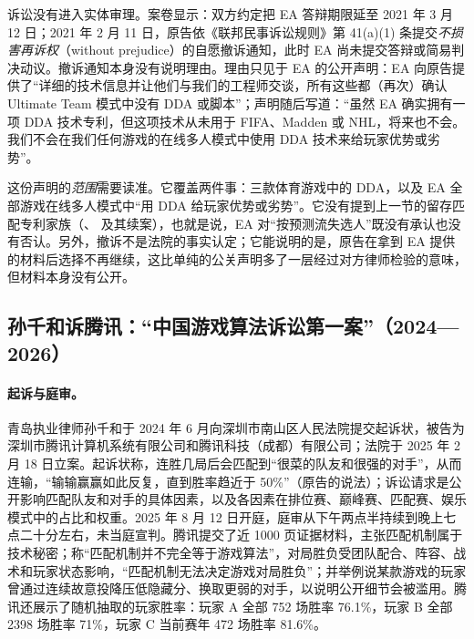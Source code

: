 诉讼没有进入实体审理。案卷显示：双方约定把 EA 答辩期限延至 2021 年 3 月 12 日；2021 年 2 月 11 日，原告依《联邦民事诉讼规则》第 41(a)(1) 条提交\emph{不损害再诉权}（without prejudice）的自愿撤诉通知，此时 EA 尚未提交答辩或简易判决动议\cite{courtlistener2021zajonc}\tagOff。撤诉通知本身没有说明理由。理由只见于 EA 的公开声明：EA 向原告提供了“详细的技术信息并让他们与我们的工程师交谈，所有这些都（再次）确认 Ultimate Team 模式中没有 DDA 或脚本”；声明随后写道：“虽然 EA 确实拥有一项 DDA 技术专利，但这项技术从未用于 FIFA、Madden 或 NHL，将来也不会。我们不会在我们任何游戏的在线多人模式中使用 DDA 技术来给玩家优势或劣势”\cite{ea2021dda}\tagOff。

这份声明的\emph{范围}需要读准。它覆盖两件事：三款体育游戏中的 DDA，以及 EA 全部游戏在线多人模式中“用 DDA 给玩家优势或劣势”。它没有提到上一节的留存匹配专利家族（、 及其续案），也就是说，EA 对“按预测流失选人”既没有承认也没有否认。另外，撤诉不是法院的事实认定；它能说明的是，原告在拿到 EA 提供的材料后选择不再继续，这比单纯的公关声明多了一层经过对方律师检验的意味，但材料本身没有公开。

\subsection{孙千和诉腾讯：“中国游戏算法诉讼第一案”（2024—2026）}

\paragraph{起诉与庭审。}
青岛执业律师孙千和于 2024 年 6 月向深圳市南山区人民法院提交起诉状，被告为深圳市腾讯计算机系统有限公司和腾讯科技（成都）有限公司；法院于 2025 年 2 月 18 日立案\cite{zhang2026hokfeb}\tagOff。起诉状称，连胜几局后会匹配到“很菜的队友和很强的对手”，从而连输，“输输赢赢如此反复，直到胜率趋近于 50\%”\tagCom（原告的说法）；诉讼请求是公开影响匹配队友和对手的具体因素，以及各因素在排位赛、巅峰赛、匹配赛、娱乐模式中的占比和权重\cite{fan2025hok}\tagOff。2025 年 8 月 12 日开庭，庭审从下午两点半持续到晚上七点二十分左右，未当庭宣判\cite{fan2025hok}\tagOff。腾讯提交了近 1000 页证据材料\cite{zhang2026hokfeb}\tagOff，主张匹配机制属于技术秘密；称“匹配机制并不完全等于游戏算法”，对局胜负受团队配合、阵容、战术和玩家状态影响，“匹配机制无法决定游戏对局胜负”；并举例说某款游戏的玩家曾通过连续故意投降压低隐藏分、换取更弱的对手，以说明公开细节会被滥用\cite{zhang2025hok}\tagOff。腾讯还展示了随机抽取的玩家胜率：玩家 A 全部 752 场胜率 76.1\%，玩家 B 全部 2398 场胜率 71\%，玩家 C 当前赛年 472 场胜率 81.6\%\cite{fan2025hok,zhang2025hok}\tagOff。

